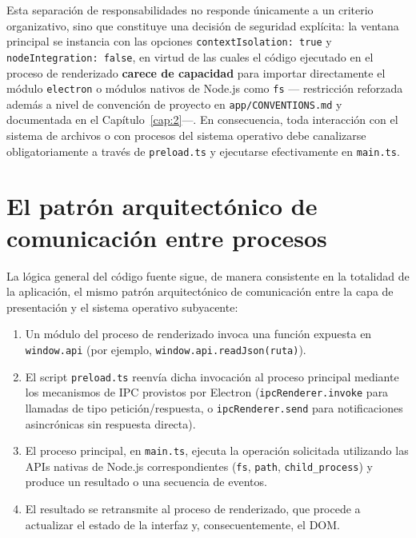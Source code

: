 Esta separaci\'on de responsabilidades no responde \'unicamente a un
criterio organizativo, sino que constituye una decisi\'on de seguridad
expl\'icita: la ventana principal se instancia con las opciones
\texttt{contextIsolation: true} y \texttt{nodeIntegration: false}, en virtud
de las cuales el c\'odigo ejecutado en el proceso de renderizado
\textbf{carece de capacidad} para importar directamente el m\'odulo
\texttt{electron} o m\'odulos nativos de Node.js como \texttt{fs} —
restricci\'on reforzada adem\'as a nivel de convenci\'on de proyecto en
\texttt{app/CONVENTIONS.md} y documentada en el Cap\'itulo~\ref{cap:2}—.
En consecuencia, toda interacci\'on con el sistema de archivos o con
procesos del sistema operativo debe canalizarse obligatoriamente a trav\'es
de \texttt{preload.ts} y ejecutarse efectivamente en \texttt{main.ts}.

\section{El patr\'on arquitect\'onico de comunicaci\'on entre procesos}

La l\'ogica general del c\'odigo fuente sigue, de manera consistente en la
totalidad de la aplicaci\'on, el mismo patr\'on arquitect\'onico de
comunicaci\'on entre la capa de presentaci\'on y el sistema operativo
subyacente:

\begin{enumerate}
    \item Un m\'odulo del proceso de renderizado invoca una funci\'on
    expuesta en \texttt{window.api} (por ejemplo,
    \texttt{window.api.readJson(ruta)}).
    \item El script \texttt{preload.ts} reenv\'ia dicha invocaci\'on al
    proceso principal mediante los mecanismos de IPC provistos por Electron
    (\texttt{ipcRenderer.invoke} para llamadas de tipo petici\'on/respuesta,
    o \texttt{ipcRenderer.send} para notificaciones asincr\'onicas sin
    respuesta directa).
    \item El proceso principal, en \texttt{main.ts}, ejecuta la operaci\'on
    solicitada utilizando las APIs nativas de Node.js correspondientes
    (\texttt{fs}, \texttt{path}, \texttt{child\_process}) y produce un
    resultado o una secuencia de eventos.
    \item El resultado se retransmite al proceso de renderizado, que
    procede a actualizar el estado de la interfaz y, consecuentemente, el
    DOM.
\end{enumerate}

